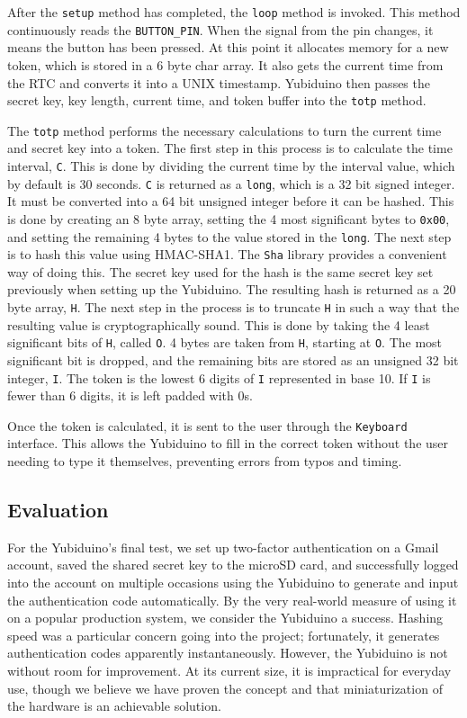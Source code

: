 \documentclass[conference]{IEEEtran}
\begin{document}
After the \texttt{setup} method has completed, the \texttt{loop} method is
invoked.  This method continuously reads the \texttt{BUTTON\_PIN}.  When the
signal from the pin changes, it means the button has been pressed.  At this
point it allocates memory for a new token, which is stored in a 6 byte char
array.  It also gets the current time from the RTC and converts it into a UNIX
timestamp.  Yubiduino then passes the secret key, key length, current time, and
token buffer into the \texttt{totp} method.

The \texttt{totp} method performs the necessary calculations to turn the
current time and secret key into a token.  The first step in this process is to
calculate the time interval, \texttt{C}.  This is done by dividing the current
time by the interval value, which by default is 30 seconds. \texttt{C} is
returned as a \texttt{long}, which is a 32 bit signed integer.  It must be
converted into a 64 bit unsigned integer before it can be hashed.  This is done
by creating an 8 byte array, setting the 4 most significant bytes to
\texttt{0x00}, and setting the remaining 4 bytes to the value stored in the
\texttt{long}.  The next step is to hash this value using HMAC-SHA1.  The
\texttt{Sha} library provides a convenient way of doing this.  The secret key
used for the hash is the same secret key set previously when setting up the
Yubiduino.  The resulting hash is returned as a 20 byte array, \texttt{H}.  The
next step in the process is to truncate \texttt{H} in such a way that the
resulting value is cryptographically sound. This is done by taking the 4 least
significant bits of \texttt{H}, called \texttt{O}.  4 bytes are taken from
\texttt{H}, starting at \texttt{O}.  The most significant bit is dropped, and
the remaining bits are stored as an unsigned 32 bit integer, \texttt{I}.  The
token is the lowest 6 digits of \texttt{I} represented in base 10.  If
\texttt{I} is fewer than 6 digits, it is left padded with 0s.

Once the token is calculated, it is sent to the user through the
\texttt{Keyboard} interface.  This allows the Yubiduino to fill in the correct
token without the user needing to type it themselves, preventing errors from
typos and timing.


\subsection{Evaluation}
For the Yubiduino's final test, we set up two-factor authentication on a Gmail account, saved the shared secret key to the microSD card, and successfully logged into the account on multiple occasions using the Yubiduino to generate and input the authentication code automatically. By the very real-world measure of using it on a popular production system, we consider the Yubiduino a success. Hashing speed was a particular concern going into the project; fortunately, it generates authentication codes apparently instantaneously. However, the Yubiduino is not without room for improvement. At its current size, it is impractical for everyday use, though we believe we have proven the concept and that miniaturization of the hardware is an achievable solution.
\end{document}
